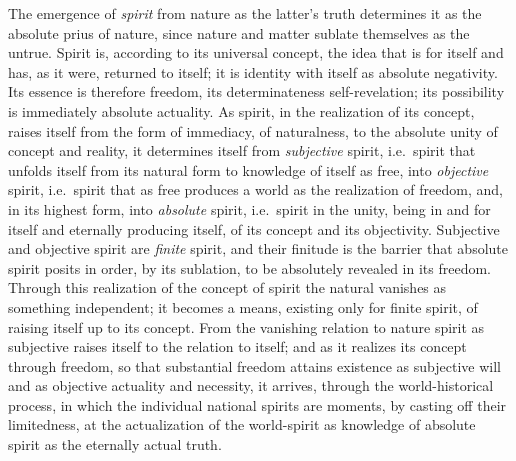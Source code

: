 The emergence of \emph{spirit} from nature as the latter's truth
determines it as the absolute prius of nature, since nature and matter
sublate themselves as the untrue. Spirit is, according to its universal
concept, the idea that is for itself and has, as it were, returned to
itself; it is identity with itself as absolute negativity. Its essence
is therefore freedom, its determinateness self-revelation; its
possibility is immediately absolute actuality. As spirit, in the
realization of its concept, raises itself from the form of immediacy,
of naturalness, to the absolute unity of concept and reality, it
determines itself from \emph{subjective} spirit, i.e.\ spirit that
unfolds itself from its natural form to knowledge of itself as free,
into \emph{objective} spirit, i.e.\ spirit that as free produces a
world as the realization of freedom, and, in its highest
form, into \emph{absolute} spirit, i.e.\ spirit in the unity, being in
and for itself and eternally producing itself, of its concept and its
objectivity. Subjective and objective spirit are \emph{finite} spirit,
and their finitude is the barrier that absolute spirit posits in order,
by its sublation, to be absolutely revealed in its freedom. Through this
realization of the concept of spirit the natural vanishes as something
independent; it becomes a means, existing only for finite spirit, of
raising itself up to its concept. From the vanishing relation to nature
spirit as subjective raises itself to the relation to itself; and as it
realizes its concept through freedom, so that substantial freedom
attains existence as subjective will and as objective actuality and
necessity, it arrives, through the world-historical process, in which
the individual national spirits are moments, by casting off their
limitedness, at the actualization of the world-spirit as knowledge of
absolute spirit as the eternally actual truth.

